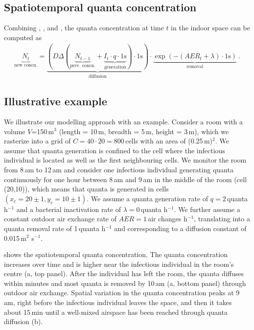 \documentclass[fleqn,11pt]{wlscirep_supp}
\begin{document}
\subsection{Spatiotemporal quanta concentration}

Combining , , and , the quanta concentration at time $t$ in the indoor space can be computed as
\begin{align}\label{eq:spattemp-N}
    \underbrace{N_{t}}_{\text{new concn.}} = \underbrace{\left(D \Delta (\underbrace{N_{t-1}}_{\text{prev. concn.}} + \underbrace{I_t \cdot q \cdot 1\text{s}}_{\text{generation}}) \cdot 1\text{s}\right)}_{\text{diffusion}} \cdot \underbrace{\exp\left(-(AER_t + \lambda) \cdot 1\text{s}\right)}_{\text{removal}} ~.
\end{align}

\subsection{Illustrative example}\label{sec:example}

We illustrate our modelling approach with an example. Consider a room with a volume $V$=150\,m$^3$ (length = 10\,m, breadth = 5\,m, height = 3\,m), which we rasterize into a grid of $C = 40 \cdot 20 = 800$\,cells with an area of (0.25\,m)$^2$. We assume that quanta generation is confined to the cell where the infectious individual is located as well as the first neighbouring cells. We monitor the room from 8\,am to 12\,am and consider one infectious individual generating quanta continuously for one hour between 8\,am and 9\,am in the middle of the room (cell (20,10)), which means that quanta is generated in cells $(x_c = 20\pm1, y_c = 10\pm1)$. We assume a quanta generation rate of $q = 2$\,quanta h$^{-1}$ and a bacterial inactivation rate of $\lambda = 0$\,quanta h$^{-1}$. We further assume a constant outdoor air exchange rate of $AER = 1$\,air changes h$^{-1}$, translating into a quanta removal rate of 1\,quanta h$^{-1}$ and corresponding to a diffusion constant of 0.015\,m$^2$ s$^{-1}$. 

 shows the spatiotemporal quanta concentration. The quanta concentration increases over time and is higher near the infectious individual in the room's centre (a, top panel). After the individual has left the room, the quanta diffuses within minutes and most quanta is removed by 10\,am (a, bottom panel) through outdoor air exchange. Spatial variation in the quanta concentration peaks at 9\,am, right before the infectious individual leaves the space, and then it takes about 15\,min until a well-mixed airspace has been reached through quanta diffusion (b). 
\end{document}
